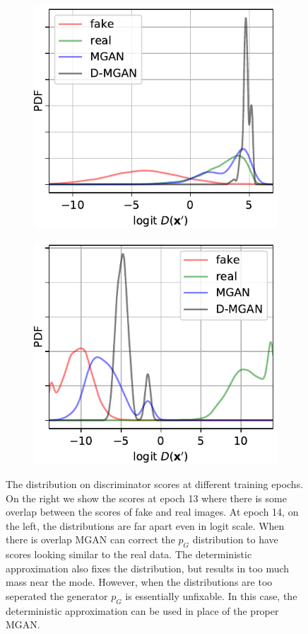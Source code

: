 \documentclass{article}
\newcommand{\PG}{{p_G}}
\begin{document}
\begin{figure}
    \centering
    \begin{subfigure}[b]{0.49\textwidth}
       \includegraphics[scale=0.9]{figures/score_dist_overlap.pdf}
    \end{subfigure}
    \begin{subfigure}[b]{0.49\textwidth}
       \includegraphics[scale=0.9]{figures/score_dist_no_overlap.pdf}
    \end{subfigure}
    \caption{{\small
    The distribution on discriminator scores at different training epochs.
    On the right we show the scores at epoch 13 where there is some overlap between the scores of fake and real images.
    At epoch 14, on the left, the distributions are far apart even in logit scale.
    When there is overlap MGAN can correct the $\PG$ distribution to have scores looking similar to the real data.
    The deterministic approximation also fixes the distribution, but results in too much mass near the mode.
    However, when the distributions are too seperated the generator $\PG$ is essentially unfixable.
    In this case, the deterministic approximation can be used in place of the proper MGAN\@.
    }}
    \label{fig:score_dist}
\end{figure}
\end{document}
